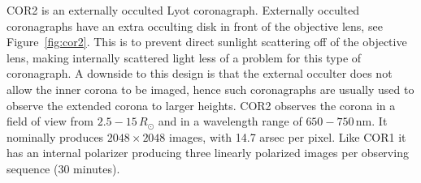 COR2 is an externally occulted Lyot coronagraph. Externally occulted coronagraphs have an extra occulting disk in front of the objective lens, see Figure~\ref{fig:cor2}. This is to prevent direct sunlight scattering off of the objective lens, making internally scattered light less of a problem for this type of coronagraph. A downside to this design is that the external occulter does not allow the inner corona to be imaged, hence such coronagraphs are usually used to observe the extended corona to larger heights. COR2 observes the corona in a field of view from $2.5 - 15\,R_{\odot}$ and in a wavelength range of $650 - 750$\,nm. It nominally produces $2048\times2048$ images, with 14.7 arsec per pixel. Like COR1 it has an internal polarizer producing three linearly polarized images per observing sequence (30 minutes).

